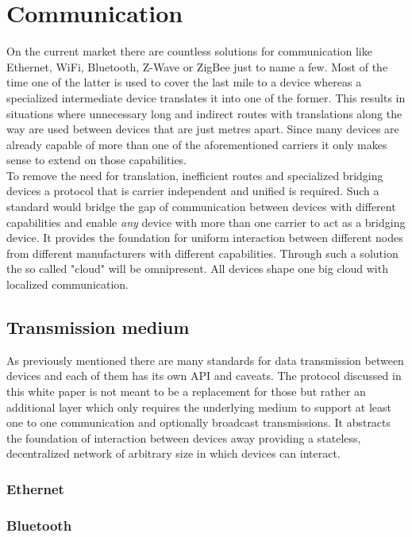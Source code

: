 \documentclass[a4paper]{report}
\begin{document}
	\chapter{Communication}
	    On the current market there are countless solutions for communication like Ethernet, WiFi, Bluetooth, Z-Wave or ZigBee just to name a few. Most of the time one of the latter is used to cover the last mile to a device whereas a specialized intermediate device translates it into one of the former. This results in situations where unnecessary long and indirect routes with translations along the way are used between devices that are just metres apart. Since many devices are already capable of more than one of the aforementioned carriers it only makes sense to extend on those capabilities.\\
	    To remove the need for translation, inefficient routes and specialized bridging devices a protocol that is carrier independent and unified is required. Such a standard would bridge the gap of communication between devices with different capabilities and enable \emph{any} device with more than one carrier to act as a bridging device. It provides the foundation for uniform interaction between different nodes from different manufacturers with different capabilities. Through such a solution the so called "cloud" will be omnipresent. All devices shape one big cloud with localized communication. 
		    
	    \newpage
	    
		\section{Transmission medium}
		    As previously mentioned there are many standards for data transmission between devices and each of them has its own API and caveats. The protocol discussed in this white paper is not meant to be a replacement for those but rather an additional layer which only requires the underlying medium to support at least one to one communication and optionally broadcast transmissions. It abstracts the foundation of interaction between devices away providing a stateless, decentralized network of arbitrary size in which devices can interact.
		    \subsection{Ethernet}
		    \subsection{Bluetooth}
		    
\end{document}
